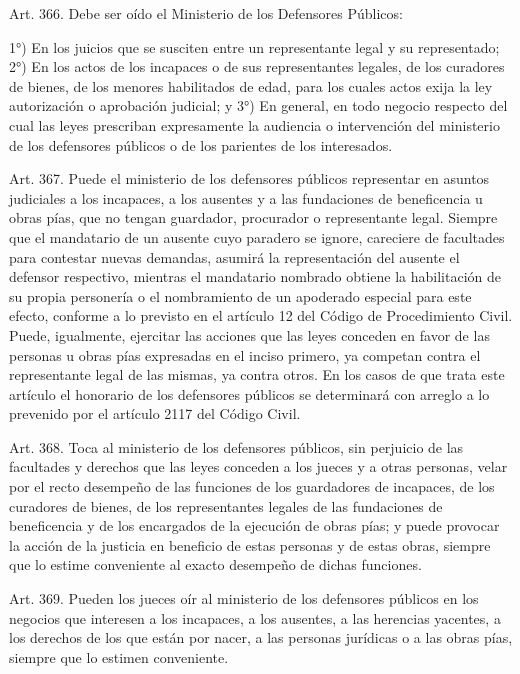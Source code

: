     Art. 366. Debe ser oído el Ministerio de los Defensores Públicos:

    1°) En los juicios que se susciten entre un representante legal y su representado;
    2°) En los actos de los incapaces o de sus representantes legales, de los curadores de bienes, de los menores habilitados de edad, para los cuales actos exija la ley autorización o aprobación judicial; y
    3°) En general, en todo negocio respecto del cual las leyes prescriban expresamente la audiencia o intervención del ministerio de los defensores públicos o de los parientes de los interesados.

    Art. 367. Puede el ministerio de los defensores públicos representar en asuntos judiciales a los incapaces, a los ausentes y a las fundaciones de beneficencia u obras pías, que no tengan guardador, procurador o representante legal.
    Siempre que el mandatario de un ausente cuyo paradero se ignore, careciere de facultades para contestar nuevas demandas, asumirá la representación del ausente el defensor respectivo, mientras el mandatario nombrado obtiene la habilitación de su propia personería o el nombramiento de un apoderado especial para este efecto, conforme a lo previsto en el artículo 12 del Código de Procedimiento Civil.
    Puede, igualmente, ejercitar las acciones que las leyes conceden en favor de las personas u obras pías expresadas en el inciso primero, ya competan contra el representante legal de las mismas, ya contra otros.
    En los casos de que trata este artículo el honorario de los defensores públicos se determinará con arreglo a lo prevenido por el artículo 2117 del Código Civil.

    Art. 368. Toca al ministerio de los defensores públicos, sin perjuicio de las facultades y derechos que las leyes conceden a los jueces y a otras personas, velar por el recto desempeño de las funciones de los guardadores de incapaces, de los curadores de bienes, de los representantes legales de las fundaciones de beneficencia y de los encargados de la ejecución de obras pías; y puede provocar la acción de la justicia en beneficio de estas personas y de estas obras, siempre que lo estime conveniente al exacto desempeño de dichas funciones.

    Art. 369. Pueden los jueces oír al ministerio de los defensores públicos en los negocios que interesen a los incapaces, a los ausentes, a las herencias yacentes, a los derechos de los que están por nacer, a las personas jurídicas o a las obras pías, siempre que lo estimen conveniente.

